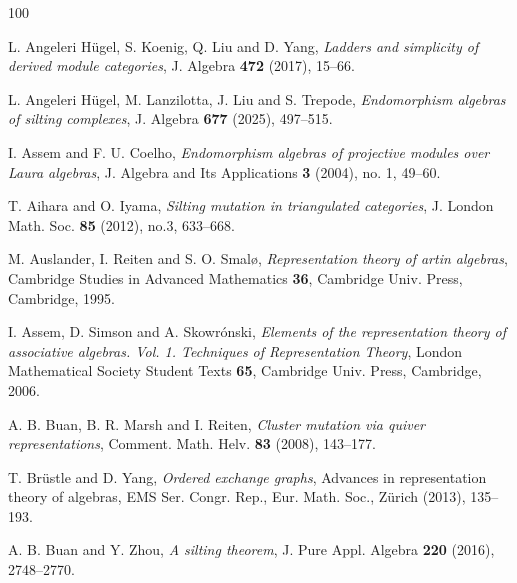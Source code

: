 \documentclass[12pt,a4paper,reqno]{amsart}
\theoremstyle{definition}
\begin{document}
\def\cprime{$'$} \def\cprime{$'$}
\providecommand{\bysame}{\leavevmode\hbox to3em{\hrulefill}\thinspace}
\providecommand{\MR}{\relax\ifhmode\unskip\space\fi MR }
\providecommand{\MRhref}[2]{%
  \href{http://www.ams.org/mathscinet-getitem?mr=#1}{#2}
}
 \begin{thebibliography}{100}

L. Angeleri H\"{u}gel, S. Koenig, Q. Liu and D. Yang,
\emph{Ladders and simplicity of derived module categories}, J. Algebra \textbf{472} (2017), 15--66.

L. Angeleri H\"{u}gel, M. Lanzilotta, J. Liu and S. Trepode, \emph{Endomorphism algebras of silting complexes}, J. Algebra \textbf{677} (2025), 497--515.

I. Assem and F. U. Coelho, \emph{Endomorphism algebras of projective modules over Laura algebras}, J. Algebra and Its Applications \textbf{3} (2004), no. 1, 49--60.


T. Aihara and O. Iyama, \emph{Silting mutation in triangulated categories}, J. London Math. Soc. \textbf{85} (2012), no.3, 633--668.

M. Auslander, I. Reiten and S. O. Smal{\o}, \emph{Representation theory of artin algebras}, Cambridge Studies in Advanced Mathematics \textbf{36}, Cambridge Univ. Press, Cambridge, 1995.

I. Assem, D. Simson and A. Skowr\'{o}nski, \emph{Elements of the representation theory of associative algebras. Vol. 1. Techniques of Representation Theory}, London Mathematical Society Student Texts \textbf{65}, Cambridge Univ. Press, Cambridge, 2006.

A. B. Buan, B. R. Marsh and I. Reiten, \emph{Cluster mutation via quiver representations}, Comment. Math. Helv. \textbf{83} (2008), 143--177.

T. Br\"{u}stle and D. Yang, \emph{Ordered exchange graphs}, Advances in representation theory of algebras, EMS Ser.
Congr. Rep., Eur. Math. Soc., Z\"{u}rich (2013), 135--193.

A. B. Buan and Y. Zhou, \emph{A silting theorem}, J. Pure Appl. Algebra \textbf{220} (2016), 2748--2770.


\end{thebibliography}
\end{document}

